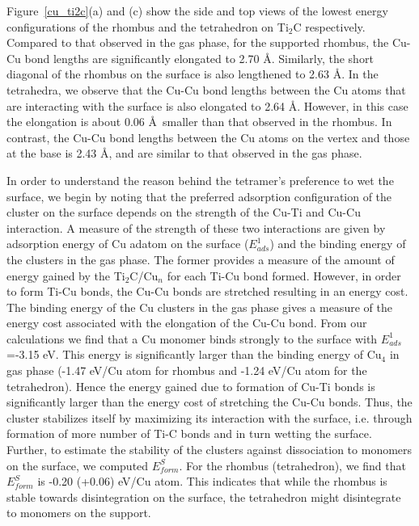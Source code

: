Figure~\ref{cu_ti2c}(a) and (c) show the side and top views of the
lowest energy configurations of the
rhombus and the tetrahedron on Ti$_2$C respectively.
Compared to that observed in the gas phase, for the supported rhombus, the Cu-Cu bond
lengths are significantly elongated to 2.70 \AA. Similarly, the short diagonal of the
rhombus on the surface is also lengthened to 2.63 \AA. In the tetrahedra, we observe that the Cu-Cu bond lengths between the Cu atoms that are interacting
with the surface is also elongated to 2.64 \AA. However, in this case the elongation is about 0.06 \AA~smaller than that observed in the rhombus. In contrast, the Cu-Cu bond lengths between the Cu atoms on the vertex and those at the base is 2.43 \AA, and are similar to that observed in the gas phase.

In order to understand the reason behind the tetramer's preference to wet the surface,
we begin by noting that the preferred adsorption configuration of the cluster on the surface depends on the strength of the Cu-Ti and Cu-Cu interaction. A measure of the strength of these two interactions are given by adsorption energy of Cu adatom  on the surface ($E_{ads}^1$) and the binding energy of the clusters in the gas phase. The former provides a measure of the amount of energy gained by the Ti$_2$C/Cu$_n$ for each Ti-Cu bond formed. However, in order to form Ti-Cu bonds, the Cu-Cu bonds are stretched resulting in an energy cost. The binding energy of the Cu clusters in the gas phase gives a measure of the energy cost associated with the elongation of the Cu-Cu bond. From our calculations we find that a Cu monomer binds strongly to the surface with $E_{ads}^1$=-3.15 eV. This energy is  significantly larger than the binding energy of Cu$_4$ in gas phase (-1.47 eV/Cu atom for rhombus and -1.24 eV/Cu atom for the tetrahedron). Hence the energy gained due to formation of Cu-Ti bonds is significantly larger than the energy cost of stretching the Cu-Cu bonds. Thus, the cluster stabilizes itself by maximizing its interaction with 
the surface, i.e. through formation of more number of Ti-C bonds and in turn wetting the surface.
Further, to estimate the stability of the clusters against dissociation to monomers on the surface, we computed $E_{form}^S$. For the rhombus (tetrahedron), we find that $E_{form}^S$ is -0.20 (+0.06) eV/Cu atom.
This indicates that while the rhombus is stable towards disintegration on the surface, the tetrahedron
might disintegrate to monomers on the support.


